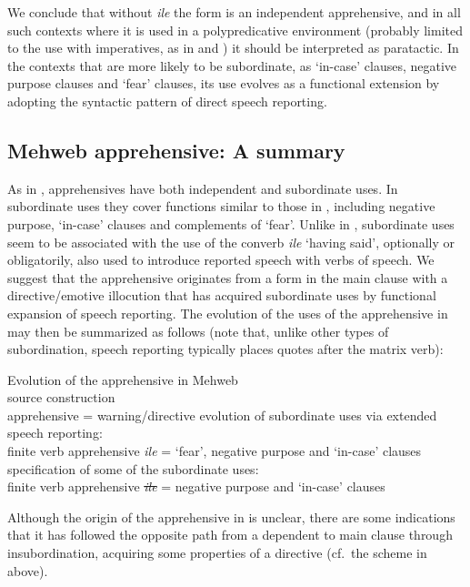 \documentclass[output=paper,colorlinks,citecolor=brown]{langscibook}
\begin{document}
We conclude that without \textit{ile} the form is an independent apprehensive, and in all such contexts where it is used in a polypredicative environment (probably limited to the use with imperatives, as in  and ) it should be interpreted as paratactic. In the contexts that are more likely to be subordinate, as `in-case' clauses, negative purpose clauses and `fear' clauses, its use evolves as a functional extension by adopting the syntactic pattern of direct speech reporting. 



\subsection{Mehweb apprehensive: A summary}
\label{subsec:Mapprehensive}
 
As in ,  apprehensives have both independent and subordinate uses. In subordinate uses they cover functions similar to those in , including negative purpose, `in-case' clauses and complements of `fear'. Unlike in , subordinate uses seem to be associated with the use of the converb \textit{ile} `having said', optionally or obligatorily, also used to introduce reported speech with verbs of speech. We suggest that the  apprehensive originates from a form in the main clause with a directive/emotive illocution that has acquired subordinate uses by functional expansion of speech reporting. The evolution of the uses of the apprehensive in  may then be summarized as follows (note that, unlike other types of subordination, speech reporting typically places quotes after the matrix verb):


\ea \label{ex:DD59} \textnormal{Evolution of the apprehensive in Mehweb} \\
\ea \label{ex:DD59a}\textnormal{source construction} \\
\textnormal{{\ob}apprehensive{\cb} = warning/directive}
\ex \textnormal{evolution of subordinate uses via extended speech reporting:} \\
\textnormal{{\ob}finite verb {\ob}apprehensive{\cb} \textit{ile}{\cb}  = `fear', negative purpose and `in-case' clauses}
\ex \textnormal{specification of some of the subordinate uses:} \\
\textnormal{{\ob}finite verb {\ob}apprehensive{\cb} \sout{\textit{ile}}{\cb}  = negative purpose and `in-case' clauses}
\z
\z

Although the origin of the apprehensive in  is unclear, there are some indications that it has followed the opposite path from a dependent to main clause through insubordination, acquiring some properties of a directive (cf.\ the scheme in  above).
\end{document}
